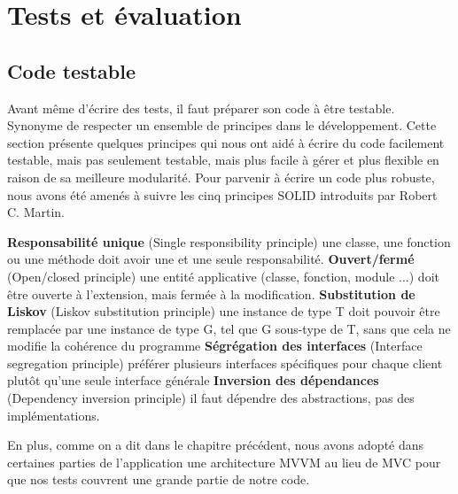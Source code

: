 \chapter{Tests et évaluation}

\section{Code testable} %
\label{sub:code_testable}
Avant même d'écrire des tests, il faut préparer son code à être testable. Synonyme de respecter un ensemble de principes dans le développement.\newline
Cette section présente quelques principes qui nous ont aidé à écrire du code facilement testable, mais pas seulement testable, mais plus facile à gérer et plus flexible en raison de sa meilleure modularité.\newline
Pour parvenir à écrire un code plus robuste, nous avons été amenés à suivre les cinq principes SOLID\cite{solid} introduits par Robert C. Martin.\cite{martin2002agile}
\begin{itemize}
	\itemb \textbf{Responsabilité unique} (Single responsibility principle)
	une classe, une fonction ou une méthode doit avoir une et une seule responsabilité.
	\itemb \textbf{Ouvert/fermé} (Open/closed principle)
	une entité applicative (classe, fonction, module ...) doit être ouverte à l'extension, mais fermée à la modification.
	\itemb \textbf{Substitution de Liskov} (Liskov substitution principle)
	une instance de type T doit pouvoir être remplacée par une instance de type G, tel que G sous-type de T,
	sans que cela ne modifie la cohérence du programme
	\itemb \textbf{Ségrégation des interfaces} (Interface segregation principle)
	préférer plusieurs interfaces spécifiques pour chaque client plutôt qu'une seule interface générale
	\itemb \textbf{Inversion des dépendances} (Dependency inversion principle)
	il faut dépendre des abstractions, pas des implémentations.
\end{itemize}
En plus, comme on a dit dans le chapitre précédent, nous avons adopté dans certaines parties de l'application une architecture MVVM au lieu de MVC pour que nos tests couvrent une grande partie de notre code.

